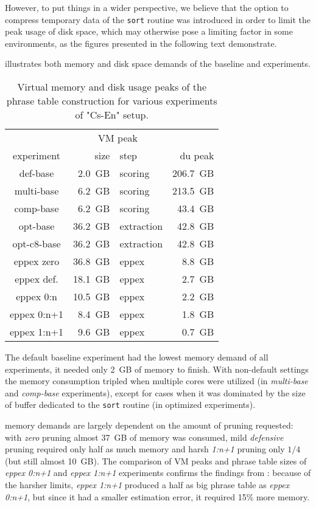 However, to put things in a wider perspective, we believe that the option to compress temporary data of
the \texttt{sort} routine was introduced in order to limit the peak usage of disk space, which may
otherwise pose a limiting factor in some environments, as the figures presented in the following text
demonstrate.

 illustrates both memory and disk space demands of the baseline
and \eppex{} experiments.

\begin{table}[ht]
\centering
\begin{tabular}{ | c | r l | r | }
\hline
 & \multicolumn{2}{|c|}{VM peak} & \\
experiment & size & step & du peak \\
\hline
\hline
def-base       &  2.0~GB &    scoring & 206.7~GB \\
multi-base     &  6.2~GB &    scoring & 213.5~GB \\
comp-base      &  6.2~GB &    scoring &  43.4~GB \\
opt-base       & 36.2~GB & extraction &  42.8~GB \\
opt-c8-base    & 36.2~GB & extraction &  42.8~GB \\
eppex zero     & 36.8~GB &      eppex &   8.8~GB \\
\hline
eppex def.     & 18.1~GB &      eppex &   2.7~GB \\
eppex 0:n      & 10.5~GB &      eppex &   2.2~GB \\
eppex 0:n+1    &  8.4~GB &      eppex &   1.8~GB \\
eppex 1:n+1    &  9.6~GB &      eppex &   0.7~GB \\
\hline
\end{tabular}
\caption{\label{cs-en-wmt13-vm-and-disk-usage-peaks}
Virtual memory and disk usage peaks of the phrase table construction for various experiments of "Cs-En" setup.}
\end{table}

The default baseline experiment had the lowest memory demand of all experiments, it needed only 2~GB
of memory to finish.
With non-default settings the memory consumption tripled when multiple cores were utilized (in \emph{multi-base}
and \emph{comp-base} experiments), except for cases when it was dominated by the size of buffer dedicated
to the \texttt{sort} routine (in optimized experiments).

\Eppex{} memory demands are largely dependent on the amount of pruning requested: with \emph{zero}
pruning almost 37~GB of memory was consumed, mild \emph{defensive} pruning required only half as much
memory and harsh \emph{1:n+1} pruning only $1/4$ (but still almost 10~GB).
The comparison of VM peaks and phrase table sizes of \emph{eppex 0:n+1} and \emph{eppex 1:n+1}
experiments confirms the findings from :
because of the harsher limits, \emph{eppex 1:n+1} produced a half as big phrase table as \emph{eppex 0:n+1},
but since it had a smaller estimation error, it required 15\% more memory.

